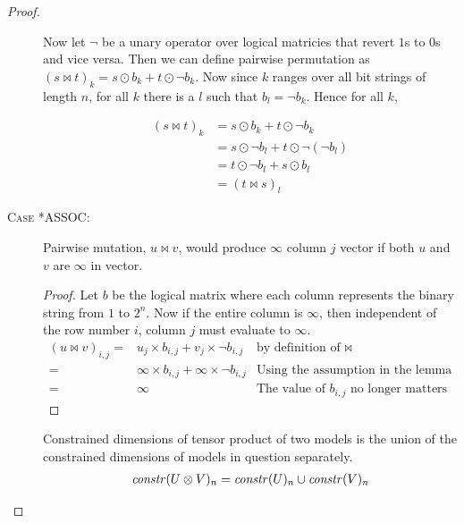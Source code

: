 \begin{proof}
\begin{description}
    Now let $\neg$ be a unary operator over logical matricies that revert $1$s
    to $0$s and vice versa. Then we can define pairwise permutation as
    $(s \bowtie t)_k = s \odot b_k + t \odot \neg b_k$. Now since $k$ ranges
    over all bit strings of length $n$, for all $k$ there is a $l$ such that
    $b_l = \neg b_k$. Hence for all $k$,

    \begin{align*}
      (s \bowtie t)_k &= s \odot b_k + t \odot \neg b_k \\
                      &= s \odot \neg b_l + t \odot \neg (\neg b_l) \\
                      &= t \odot \neg b_l + s \odot b_l \\
                      &= (t \bowtie s)_l
    \end{align*}

  \item[\textsc{Case *ASSOC}:]
    \begin{lemma}\label{lem:bowinf}
      Pairwise mutation, $u \bowtie v$, would produce $\infty$ column $j$ vector
      if both $u$ and $v$ are $\infty$ in vector.
    \end{lemma}

    \begin{proof}
      Let $b$ be the logical matrix where each column represents the binary
      string from $1$ to $2^n$. Now if the entire column is $\infty$, then
      independent of the row number $i$, column $j$ must evaluate to $\infty$.
      \begin{align*}
        (u \bowtie v)_{i,j} =& u_{j} \times b_{i,j} + v_{j} \times \neg b_{i,j}
                             & \mbox{by definition of $\bowtie$} \\
                            =& \infty \times b_{i,j} + \infty \times \neg b_{i,j}
                             & \mbox{Using the assumption in the lemma} \\
                            =& \infty 
                             & \mbox{The value of $b_{i,j}$ no longer matters}
      \end{align*}
    \end{proof}

    \begin{lemma}\label{lem:tensordims}
      Constrained dimensions of tensor product of two models is the union of the
      constrained dimensions of models in question separately.
      \begin{align*}
        \mathit{constr}(U \otimes V)_{n} = \mathit{constr}(U)_{n} \cup \mathit{constr}(V)_{n} \\
      \end{align*}
    \end{lemma}


\end{description}
\end{proof}

